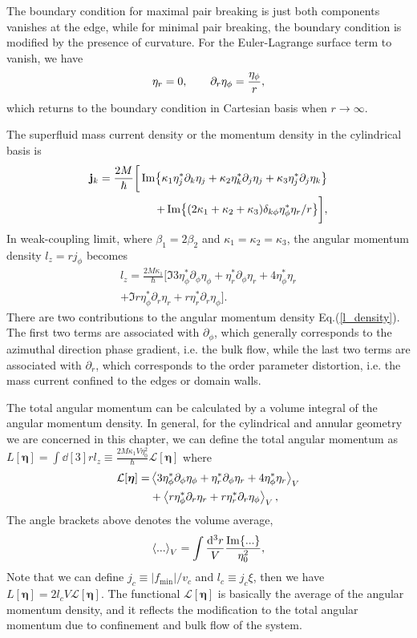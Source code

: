 \documentclass[aps,prb,reprint,groupedaddress]{revtex4-2}
\begin{document}
The boundary condition for maximal pair breaking is just both components vanishes
at the edge, while for minimal pair breaking, the boundary condition is modified
by the presence of curvature. For the Euler-Lagrange surface term to vanish,
we have\cite{Buchholtz77}
\begin{align}
    \eta_r=0,\qq{} \partial_r\eta_\phi=\frac{\eta_\phi}{r},
\end{align}
which returns to the boundary condition in Cartesian basis when $r\rightarrow\infty$.

The superfluid mass current density or the momentum density in the cylindrical basis is
\begin{align}\label{j}
    \vb{j}_k=\frac{2M}{\hbar}\bigg[\Im{\kappa_1\eta_j^*\partial_k\eta_j+\kappa_2\eta_k^*\partial_j\eta_j+\kappa_3\eta_j^*\partial_j\eta_k}\nonumber \\
        +\Im{(2\kappa_1+\kappa_2+\kappa_3)\delta_{k\phi}\eta_\phi^*\eta_r/r}\bigg],
\end{align}
In weak-coupling limit,
where $\beta_1=2\beta_2$ and $\kappa_1=\kappa_2=\kappa_3$, the angular momentum
density $l_z=rj_\phi$ becomes
\begin{align}\label{l_density}
    l_z=\frac{2M\kappa_1}{\hbar}\bigg[\Im{3\eta_\phi^*\partial_\phi\eta_\phi+\eta_r^*\partial_\phi\eta_r+4\eta_\phi^*\eta_r}\nonumber \\
        +\Im{r\eta_\phi^*\partial_r\eta_r+r\eta_r^*\partial_r\eta_\phi}\bigg].
\end{align}
There are two contributions to the angular momentum density Eq.(\ref{l_density}).
The first two terms are associated with $\partial_\phi$, which
generally corresponds to the azimuthal direction phase gradient, i.e. the bulk flow,
while the last two terms are associated with $\partial_r$, which corresponds to the
order parameter distortion, i.e. the mass current confined to the edges or domain
walls.

The total angular momentum can be calculated by a volume integral of the
angular momentum density. In general, for the cylindrical and annular
geometry we are concerned in this chapter,
we can define the total angular momentum as
$L[\bm{\eta}] = \int\dd[3]rl_z \equiv \frac{2M\kappa_1V\eta_0^2}{\hbar} \mathcal{L}[\bm{\eta}] $
where
\begin{align}\label{total_L}
    \mathcal{L}[\bm{\eta}] =
     & \ev{3\eta_\phi^*\partial_\phi\eta_\phi
        +\eta_r^*\partial_\phi\eta_r
    +4\eta_\phi^*\eta_r}_V\nonumber           \\
     & +\ev{r\eta_\phi^*\partial_r\eta_r
        +r\eta_r^*\partial_r\eta_\phi}_V,
\end{align}
The angle brackets above denotes the volume average,
\begin{align}
    \ev{...}_V=\int\frac{\dd[3]r}{V}\frac{\Im{...}}{\eta_0^2},
\end{align}
Note that we can define $j_c\equiv|f_\text{min}|/v_c$ and $l_c\equiv j_c\xi$, then we have
$L[\bm{\eta}] = 2l_c V \mathcal{L}[\bm{\eta}]$.
The functional $\mathcal{L}[\bm{\eta}]$
is basically the average of the angular momentum density,
and it reflects the modification to the total angular momentum
due to confinement and bulk flow of the system.
\end{document}
